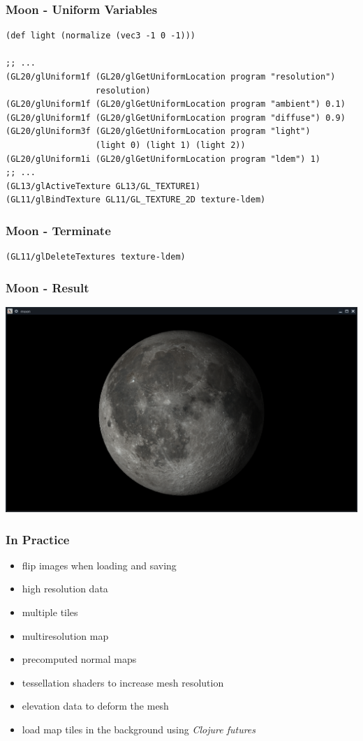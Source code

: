 \documentclass[aspectratio=169,11pt,xcolor=dvipsnames]{beamer}
\begin{document}
\begin{frame}[fragile]
  \frametitle{Moon {-} Uniform Variables}
  \begin{verbatim}
(def light (normalize (vec3 -1 0 -1)))

;; ...
(GL20/glUniform1f (GL20/glGetUniformLocation program "resolution")
                  resolution)
(GL20/glUniform1f (GL20/glGetUniformLocation program "ambient") 0.1)
(GL20/glUniform1f (GL20/glGetUniformLocation program "diffuse") 0.9)
(GL20/glUniform3f (GL20/glGetUniformLocation program "light")
                  (light 0) (light 1) (light 2))
(GL20/glUniform1i (GL20/glGetUniformLocation program "ldem") 1)
;; ...
(GL13/glActiveTexture GL13/GL_TEXTURE1)
(GL11/glBindTexture GL11/GL_TEXTURE_2D texture-ldem)
  \end{verbatim}
\end{frame}

\begin{frame}[fragile]
  \frametitle{Moon {-} Terminate}
  \begin{verbatim}
(GL11/glDeleteTextures texture-ldem)
  \end{verbatim}
\end{frame}

\begin{frame}
  \frametitle{Moon {-} Result}
  \begin{center}
    \includegraphics[width=.8\textwidth]{moon}
  \end{center}
\end{frame}

\begin{frame}
  \frametitle{In Practice}
  \begin{itemize}
    \item flip images when loading and saving
    \item high resolution data
    \item multiple tiles
    \item multiresolution map
    \item precomputed normal maps
    \item tessellation shaders to increase mesh resolution
    \item elevation data to deform the mesh
    \item load map tiles in the background using \emph{Clojure futures}
  \end{itemize}
\end{frame}
\end{document}
